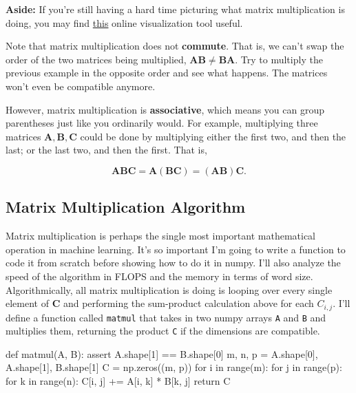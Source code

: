 \documentclass[
  letterpaper,
  DIV=11,
  numbers=noendperiod]{scrreprt}
\newenvironment{Shaded}{\begin{snugshade}}{\end{snugshade}}
\newcommand{\BuiltInTok}[1]{\textcolor[rgb]{0.00,0.23,0.31}{#1}}
\newcommand{\ControlFlowTok}[1]{\textcolor[rgb]{0.00,0.23,0.31}{#1}}
\newcommand{\DecValTok}[1]{\textcolor[rgb]{0.68,0.00,0.00}{#1}}
\newcommand{\KeywordTok}[1]{\textcolor[rgb]{0.00,0.23,0.31}{#1}}
\newcommand{\NormalTok}[1]{\textcolor[rgb]{0.00,0.23,0.31}{#1}}
\newcommand{\OperatorTok}[1]{\textcolor[rgb]{0.37,0.37,0.37}{#1}}
\begin{document}
\textbf{Aside:} If you're still having a hard time picturing what matrix
multiplication is doing, you may find
\href{http://matrixmultiplication.xyz/}{this} online visualization tool
useful.

Note that matrix multiplication does not \textbf{commute}. That is, we
can't swap the order of the two matrices being multiplied,
\(\mathbf{A}\mathbf{B} \neq \mathbf{B}\mathbf{A}\). Try to multiply the
previous example in the opposite order and see what happens. The
matrices won't even be compatible anymore.

However, matrix multiplication is \textbf{associative}, which means you
can group parentheses just like you ordinarily would. For example,
multiplying three matrices \(\mathbf{A}, \mathbf{B}, \mathbf{C}\) could
be done by multiplying either the first two, and then the last; or the
last two, and then the first. That is,

\[\mathbf{A}\mathbf{B}\mathbf{C} = \mathbf{A}(\mathbf{B}\mathbf{C}) = (\mathbf{A}\mathbf{B})\mathbf{C}.\]

\hypertarget{matrix-multiplication-algorithm}{%
\subsection{Matrix Multiplication
Algorithm}\label{matrix-multiplication-algorithm}}

Matrix multiplication is perhaps the single most important mathematical
operation in machine learning. It's so important I'm going to write a
function to code it from scratch before showing how to do it in numpy.
I'll also analyze the speed of the algorithm in FLOPS and the memory in
terms of word size. Algorithmically, all matrix multiplication is doing
is looping over every single element of \(\mathbf{C}\) and performing
the sum-product calculation above for each \(C_{i,j}\). I'll define a
function called \texttt{matmul} that takes in two numpy arrays
\texttt{A} and \texttt{B} and multiplies them, returning the product
\texttt{C} if the dimensions are compatible.

\begin{Shaded}
\begin{Highlighting}[]
\KeywordTok{def}\NormalTok{ matmul(A, B):}
    \ControlFlowTok{assert}\NormalTok{ A.shape[}\DecValTok{1}\NormalTok{] }\OperatorTok{==}\NormalTok{ B.shape[}\DecValTok{0}\NormalTok{]}
\NormalTok{    m, n, p }\OperatorTok{=}\NormalTok{ A.shape[}\DecValTok{0}\NormalTok{], A.shape[}\DecValTok{1}\NormalTok{], B.shape[}\DecValTok{1}\NormalTok{]}
\NormalTok{    C }\OperatorTok{=}\NormalTok{ np.zeros((m, p))}
    \ControlFlowTok{for}\NormalTok{ i }\KeywordTok{in} \BuiltInTok{range}\NormalTok{(m):}
        \ControlFlowTok{for}\NormalTok{ j }\KeywordTok{in} \BuiltInTok{range}\NormalTok{(p):}
            \ControlFlowTok{for}\NormalTok{ k }\KeywordTok{in} \BuiltInTok{range}\NormalTok{(n):}
\NormalTok{                C[i, j] }\OperatorTok{+=}\NormalTok{ A[i, k] }\OperatorTok{*}\NormalTok{ B[k, j]}
    \ControlFlowTok{return}\NormalTok{ C}
\end{Highlighting}
\end{Shaded}
\end{document}
